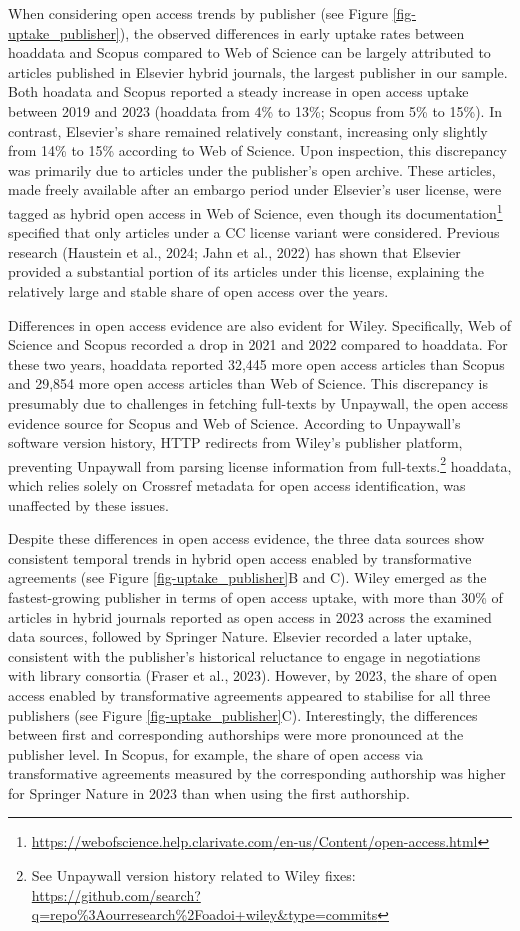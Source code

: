 \documentclass[a4paper,man,floatsintext,longtable,noextraspace,10pt]{apa6}
\begin{document}
When considering open access trends by publisher (see Figure
\ref{fig-uptake_publisher}), the observed differences in early uptake
rates between hoaddata and Scopus compared to Web of Science can be
largely attributed to articles published in Elsevier hybrid journals,
the largest publisher in our sample. Both hoadata and Scopus reported a
steady increase in open access uptake between 2019 and 2023 (hoaddata
from 4\% to 13\%; Scopus from 5\% to 15\%). In contrast, Elsevier's
share remained relatively constant, increasing only slightly from 14\%
to 15\% according to Web of Science. Upon inspection, this discrepancy
was primarily due to articles under the publisher's open archive. These
articles, made freely available after an embargo period under Elsevier's
user license, were tagged as hybrid open access in Web of Science, even
though its documentation\footnote{\url{https://webofscience.help.clarivate.com/en-us/Content/open-access.html}}
specified that only articles under a CC license variant were considered.
Previous research (Haustein et al., 2024; Jahn et al., 2022) has shown
that Elsevier provided a substantial portion of its articles under this
license, explaining the relatively large and stable share of open access
over the years.

Differences in open access evidence are also evident for Wiley.
Specifically, Web of Science and Scopus recorded a drop in 2021 and 2022
compared to hoaddata. For these two years, hoaddata reported 32,445 more
open access articles than Scopus and 29,854 more open access articles
than Web of Science. This discrepancy is presumably due to challenges in
fetching full-texts by Unpaywall, the open access evidence source for
Scopus and Web of Science. According to Unpaywall's software version
history, HTTP redirects from Wiley's publisher platform, preventing
Unpaywall from parsing license information from full-texts.\footnote{See
  Unpaywall version history related to Wiley fixes:
  \url{https://github.com/search?q=repo\%3Aourresearch\%2Foadoi+wiley&type=commits}}
hoaddata, which relies solely on Crossref metadata for open access
identification, was unaffected by these issues.

Despite these differences in open access evidence, the three data
sources show consistent temporal trends in hybrid open access enabled by
transformative agreements (see Figure \ref{fig-uptake_publisher}B and
C). Wiley emerged as the fastest-growing publisher in terms of open
access uptake, with more than 30\% of articles in hybrid journals
reported as open access in 2023 across the examined data sources,
followed by Springer Nature. Elsevier recorded a later uptake,
consistent with the publisher's historical reluctance to engage in
negotiations with library consortia (Fraser et al., 2023). However, by
2023, the share of open access enabled by transformative agreements
appeared to stabilise for all three publishers (see Figure
\ref{fig-uptake_publisher}C). Interestingly, the differences between
first and corresponding authorships were more pronounced at the
publisher level. In Scopus, for example, the share of open access via
transformative agreements measured by the corresponding authorship was
higher for Springer Nature in 2023 than when using the first authorship.
\end{document}
